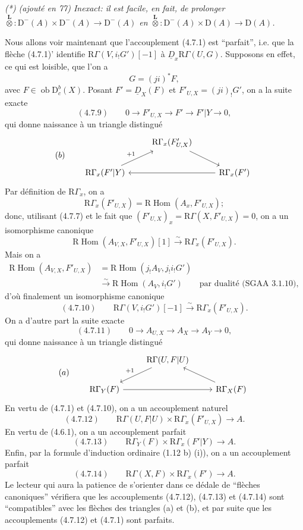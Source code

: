 \documentclass[11pt]{article}
\DeclareMathOperator{\Hom}{Hom}
\newcommand{\R}{\mathrm{R}}
\newcommand{\D}{\mathrm{D}}
\newcommand{\ob}{\operatorname{ob}}
\providecommand{\Hom}{\operatorname{Hom}}
\providecommand{\ob}{\operatorname{ob}}
\providecommand{\R}{\mathrm R}
\providecommand{\Hom}{\operatorname{Hom}}
\begin{document}
\emph{(*) (ajouté en 77) Inexact: il est facile, en fait, de prolonger $\overset{\mathbf L}{\otimes}:\D^-(A)\times\D^-(A)\to\D^-(A)$ en $\overset{\mathbf L}{\otimes}:\D^-(A)\times\D(A)\to\D(A)$.}

Nous allons voir maintenant que l'accouplement (4.7.1) est ``parfait'', i.e. que la flèche (4.7.1)' identifie $\R\Gamma(V,i_!G')[-1]$ à $\underline{D}_x\R\Gamma(U,G)$. Supposons en effet, ce qui est loisible, que l'on a
\[
G=(ji)^*F,
\]
avec $F\in\ob\D_c^b(X)$. Posant $F'=\underline{D}_X(F)$ et $F'_{U,X}=(ji)_!G'$, on a la suite exacte
\[
(4.7.9)\qquad 0\longrightarrow F'_{U,X}\longrightarrow F'\longrightarrow F'|Y\longrightarrow0,
\]
qui donne naissance à un triangle distingué
\[
(b)\qquad
\begin{tikzcd}
& \R\Gamma_x(F'_{U,X}) \arrow[dr] \\
\R\Gamma_x(F'|Y) \arrow[ur,"{+1}"] && \R\Gamma_x(F') \arrow[ll]
\end{tikzcd}
\]
Par définition de $\R\Gamma_x$, on a
\[
\R\Gamma_x(F'_{U,X})=\R\Hom(A_x,F'_{U,X});
\]
donc, utilisant (4.7.7) et le fait que $(F'_{U,X})_x=\R\Gamma(X,F'_{U,X})=0$, on a un isomorphisme canonique
\[
\R\Hom(A_{V,X},F'_{U,X})[1]\xrightarrow{\sim}\R\Gamma_x(F'_{U,X}).
\]
Mais on a
\[
\begin{aligned}
\R\Hom(A_{V,X},F'_{U,X})&=\R\Hom(j_!A_V,j_!i_!G')\\
&\xrightarrow{\sim}\R\Hom(A_V,i_!G')\qquad\text{par dualité (SGAA~3.1.10)},
\end{aligned}
\]
d'où finalement un isomorphisme canonique
\[
(4.7.10)\qquad \R\Gamma(V,i_!G')[-1]\xrightarrow{\sim}\R\Gamma_x(F'_{U,X}).
\]
On a d'autre part la suite exacte
\[
(4.7.11)\qquad 0\longrightarrow A_{U,X}\longrightarrow A_X\longrightarrow A_Y\longrightarrow0,
\]
qui donne naissance à un triangle distingué
\[
(a)\qquad
\begin{tikzcd}
& \R\Gamma(U,F|U) \arrow[dl,"{+1}"'] \\
\R\Gamma_Y(F) \arrow[rr] && \R\Gamma_X(F) \arrow[ul]
\end{tikzcd}
\]
En vertu de (4.7.1) et (4.7.10), on a un accouplement naturel
\[
(4.7.12)\qquad \R\Gamma(U,F|U)\times\R\Gamma_x(F'_{U,X})\longrightarrow A.
\]
En vertu de (4.6.1), on a un accouplement parfait
\[
(4.7.13)\qquad \R\Gamma_Y(F)\times\R\Gamma_x(F'|Y)\longrightarrow A.
\]
Enfin, par la formule d'induction ordinaire (1.12 b) (i)), on a un accouplement parfait
\[
(4.7.14)\qquad \R\Gamma(X,F)\times\R\Gamma_x(F')\longrightarrow A.
\]
Le lecteur qui aura la patience de s'orienter dans ce dédale de ``flèches canoniques'' vérifiera que les accouplements (4.7.12), (4.7.13) et (4.7.14) sont ``compatibles'' avec les flèches des triangles (a) et (b), et par suite que les accouplements (4.7.12) et (4.7.1) sont parfaits.
\end{document}
